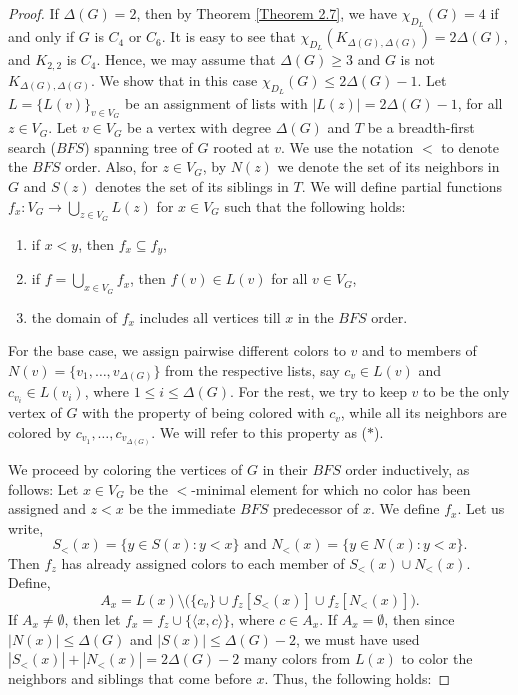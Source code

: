 \documentclass[12pt,reqno,a4paper]{amsart}
\theoremstyle{definition}
\begin{document}
\begin{proof}
   If $\Delta(G)=2$, then by Theorem \ref{Theorem 2.7}, we have $\chi_{D_L}(G) = 4$ if and only if $G$ is $C_4$ or $C_6$. It is easy to see that $\chi_{D_L}(K_{\Delta(G),\Delta(G)}) = 2\Delta(G)$, and $K_{2,2}$ is $C_4$. Hence, we may assume that $\Delta(G) \geq 3$ and $G$ is not $K_{\Delta(G),\Delta(G)}$. We show that in this case $\chi_{D_L}(G) \leq 2\Delta(G)-1$. Let $L=\{L(v)\}_{v\in V_G}$ be an assignment of lists with $|L(z)| = 2\Delta(G)-1$, for all $z\in V_G$. 
   Let $v\in V_G$ be a vertex with degree $\Delta(G)$ and $T$ be a breadth-first search ($BFS$) spanning tree of $G$ rooted at $v$. We use the notation $<$ to denote the $BFS$ order. Also, for $z\in V_{G}$, by $N(z)$ we denote the set of its neighbors in $G$ and $S(z)$ denotes the set of its siblings in $T$. We will define partial functions $f_x: V_{G} \to \bigcup_{z\in V_{G}}L(z)$ for $x\in V_{G}$ such that the following holds: 
\begin{enumerate}
    \item[(i)] if $x < y$, then $f_x\subseteq f_y$,
    \item[(ii)] if $f=\bigcup_{x\in V_{G}} f_x$, then $f(v)\in L(v)$ for all $v\in V_{G}$,
    
    \item[(iii)] the domain of $f_{x}$ includes all vertices till $x$ in the $BFS$ order.
\end{enumerate}
For the base case, we assign pairwise different colors to $v$ and to members of $N(v) = \{v_1,\dots, v_{\Delta(G)}\}$ from the respective lists, say $c_v\in L(v)$ and $c_{v_i}\in L(v_i)$, where $1\leq i\leq \Delta(G)$. 
For the rest, we try to keep $v$ to be the only vertex of $G$ with the property of being colored with $c_v$, while all its neighbors are colored by $c_{v_1},\dots, c_{v_{\Delta(G)}}$. We will refer to this property as ($\ast$). 

We proceed by coloring the vertices of $G$ in their $BFS$ order inductively, as follows: Let $x\in V_{G}$ be the $<$-minimal element for which no color has been assigned and $z<x$ be the immediate $BFS$ predecessor of $x$. We define $f_x$. Let us write,
$$
    S_<(x) = \{y\in S(x): y<x\} \text{ and } N_<(x) = \{y\in N(x): y<x\}.
$$
Then $f_z$ has already assigned colors to each member of $S_<(x) \cup N_<(x)$. Define,
$$
A_x= L(x)\setminus \Big(\{c_v\} \cup f_z[S_<(x)] \cup f_z[N_<(x)]\Big).
$$
If $A_{x} \neq \emptyset$, then let $f_x = f_z \cup \{\langle x, c \rangle\} $,
where $c\in A_x$. If $A_x=\emptyset$, then since $|N(x)| \leq \Delta(G)$ and $|S(x)|\leq \Delta(G)-2$, we must have used $|S_<(x)| + |N_<(x)| = 2\Delta(G) -2$ many colors from $L(x)$ to color the neighbors and siblings that come before $x$. Thus, the following holds: 


\end{proof}
\end{document}
